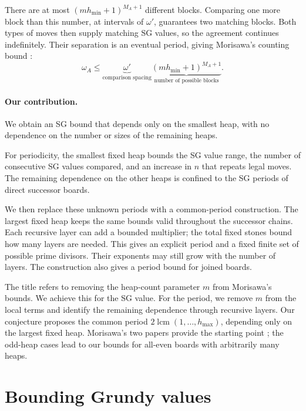 \documentclass[11pt]{article}
\begin{document}
There are at most $(mh_{\min}+1)^{M_A+1}$ different blocks.
Comparing one more block than this number, at intervals of
$\omega'$, guarantees two matching blocks. Both types of moves
then supply matching SG values, so the agreement continues
indefinitely. Their separation is an eventual period, giving
Morisawa's counting bound
\cite[Section 8]{Morisawa2026}:
\begin{equation}
 \boxed{
 \omega_A\le
 \underbrace{\omega'}_{\text{comparison spacing}}
 \underbrace{(mh_{\min}+1)^{M_A+1}}_{\text{number of possible blocks}}.
 }
 \label{eq:oldperiodbound}
\end{equation}

\paragraph{Our contribution.}
We obtain an SG bound that depends only on the smallest heap,
with no dependence on the number or sizes of the remaining heaps.

For periodicity, the smallest fixed heap bounds the SG value
range, the number of consecutive SG values compared, and
an increase in $n$ that repeats legal moves. The remaining
dependence on the other heaps is confined to the SG periods
of direct successor boards.

We then replace these unknown periods with a common-period construction.
The largest fixed heap keeps the same bounds valid throughout the
successor chains. Each recursive layer can add a bounded multiplier;
the total fixed stones bound how many layers are needed. This gives
an explicit period and a fixed finite set of possible prime divisors.
Their exponents may still grow with the number of layers.
The construction also gives a period bound for joined boards.

The title refers to removing the heap-count parameter $m$ from
Morisawa's bounds. We achieve this for the SG value. For the period,
we remove $m$ from the local terms and identify the remaining
dependence through recursive layers. Our conjecture proposes the
common period $2\operatorname{lcm}(1,\ldots,h_{\max})$, depending
only on the largest fixed heap.
Morisawa's two papers provide the starting point
\cite{Morisawa2025,Morisawa2026}; the odd-heap cases lead to our
bounds for all-even boards with arbitrarily many heaps.

\section{Bounding Grundy values}
\label{sec:values}
\end{document}
